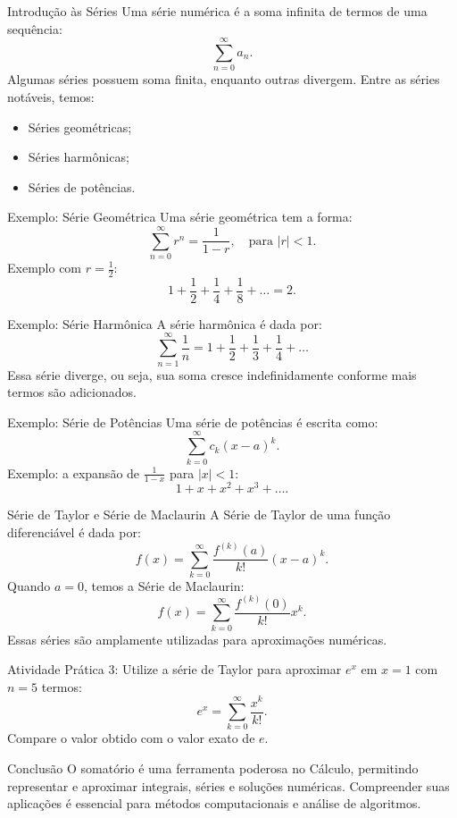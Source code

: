 \documentclass{beamer}
\begin{document}
\begin{frame}{Introdução às Séries}
    Uma série numérica é a soma infinita de termos de uma sequência:
    \[
        \sum_{n=0}^{\infty} a_n.
    \]
    Algumas séries possuem soma finita, enquanto outras divergem. Entre as séries notáveis, temos:
    \begin{itemize}
        \item Séries geométricas;
        \item Séries harmônicas;
        \item Séries de potências.
    \end{itemize}
\end{frame}

\begin{frame}{Exemplo: Série Geométrica}
    Uma série geométrica tem a forma:
    \[
        \sum_{n=0}^{\infty} r^n = \frac{1}{1 - r}, \quad \text{para } |r| < 1.
    \]
    Exemplo com \( r = \displaystyle \frac{1}{2} \):
    \[
        1 + \frac{1}{2} + \frac{1}{4} + \frac{1}{8} + \dots = 2.
    \]
\end{frame}

\begin{frame}{Exemplo: Série Harmônica}
    A série harmônica é dada por:
    \[
        \sum_{n=1}^{\infty} \frac{1}{n} = 1 + \frac{1}{2} + \frac{1}{3} + \frac{1}{4} + \dots
    \]
    Essa série diverge, ou seja, sua soma cresce indefinidamente conforme mais termos são adicionados.
\end{frame}

\begin{frame}{Exemplo: Série de Potências}
    Uma série de potências é escrita como:
    \[
        \sum_{k=0}^{\infty} c_k (x-a)^k.
    \]
    Exemplo: a expansão de \( \frac{1}{1-x} \) para \( |x| < 1 \):
    \[
        1 + x + x^2 + x^3 + \dots.
    \]
\end{frame}


\begin{frame}{Série de Taylor e Série de Maclaurin}
    A Série de Taylor de uma função diferenciável é dada por:
    \[
        f(x) = \sum_{k=0}^{\infty} \frac{f^{(k)}(a)}{k!} (x-a)^k.
    \]
    Quando \( a = 0 \), temos a Série de Maclaurin:
    \[
        f(x) = \sum_{k=0}^{\infty} \frac{f^{(k)}(0)}{k!} x^k.
    \]
    Essas séries são amplamente utilizadas para aproximações numéricas.
\end{frame}



\begin{frame}{Atividade Prática 3:}
    Utilize a série de Taylor para aproximar \( e^x \) em \( x=1 \) com \( n=5 \) termos:
    \[
        e^x = \sum_{k=0}^{\infty} \frac{x^k}{k!}.
    \]
    Compare o valor obtido com o valor exato de \( e \).
\end{frame}

\begin{frame}{Conclusão}
    O somatório é uma ferramenta poderosa no Cálculo, permitindo representar e aproximar integrais, séries e soluções numéricas.
    Compreender suas aplicações é essencial para métodos computacionais e análise de algoritmos.
\end{frame}
\end{document}
